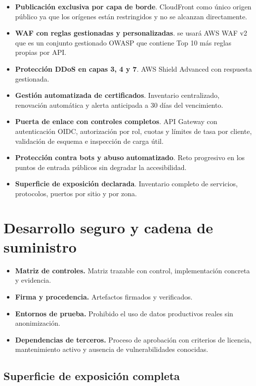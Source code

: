 \begin{itemize}
  \item \textbf{Publicación exclusiva por capa de borde}. CloudFront como único origen público ya que los orígenes están restringidos y no se alcanzan directamente.
  \item \textbf{WAF con reglas gestionadas y personalizadas}. se usará AWS WAF v2 que es un conjunto gestionado OWASP que contiene Top 10 más reglas propias por API.
  \item \textbf{Protección DDoS en capas 3, 4 y 7}. AWS Shield Advanced con respuesta gestionada.
  \item \textbf{Gestión automatizada de certificados}. Inventario centralizado, renovación automática y alerta anticipada a 30 días del vencimiento.
  \item \textbf{Puerta de enlace con controles completos}. API Gateway con autenticación OIDC, autorización por rol, cuotas y límites de tasa por cliente, validación de esquema e inspección de carga útil.
  \item \textbf{Protección contra bots y abuso automatizado}. Reto progresivo en los puntos de entrada públicos sin degradar la accesibilidad.
  \item \textbf{Superficie de exposición declarada}. Inventario completo de servicios, protocolos, puertos por sitio y por zona.
\end{itemize}

\section{Desarrollo seguro y cadena de suministro}

\begin{itemize}
  \item \textbf{Matriz de controles.} Matriz trazable con control, implementación concreta y evidencia.
  \item \textbf{Firma y procedencia.} Artefactos firmados y verificados.
  \item \textbf{Entornos de prueba.} Prohibido el uso de datos productivos reales sin anonimización.
  \item \textbf{Dependencias de terceros.} Proceso de aprobación con criterios de licencia, mantenimiento activo y ausencia de vulnerabilidades conocidas.
\end{itemize}

\subsection{Superficie de exposición completa}

